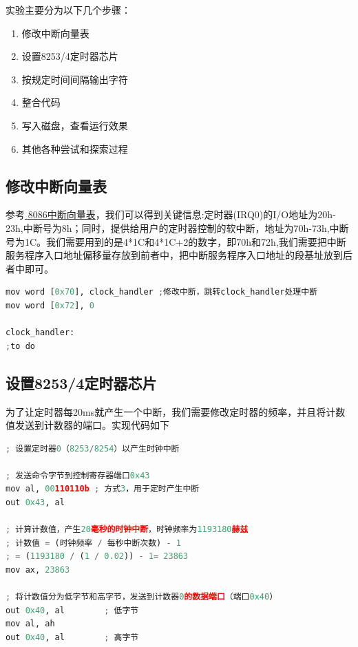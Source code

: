 \documentclass{LabReport}
\begin{document}
	实验主要分为以下几个步骤：
	
	\begin{enumerate}
		\item 修改中断向量表
		\item 设置8253/4定时器芯片
		\item 按规定时间间隔输出字符
		\item 整合代码
		\item 写入磁盘，查看运行效果
		\item 其他各种尝试和探索过程
	\end{enumerate}
	
	\subsection{修改中断向量表}
	参考\href{https://blog.csdn.net/nicholas199109/article/details/8557484?ops_request_misc=%257B%2522request%255Fid%2522%253A%2522171153468616800180615319%2522%252C%2522scm%2522%253A%252220140713.130102334.pc%255Fall.%2522%257D&request_id=171153468616800180615319&biz_id=0&utm_medium=distribute.pc_search_result.none-task-blog-2~all~first_rank_ecpm_v1~rank_v31_ecpm-2-8557484-null-null.142^v100^pc_search_result_base5&utm_term=8086%E6%97%B6%E9%92%9F%E4%B8%AD%E6%96%AD%E5%90%91%E9%87%8F%E8%A1%A8&spm=1018.2226.3001.4187}{\color{red} {8086中断向量表}}，我们可以得到关键信息:定时器(IRQ0)的I/O地址为20h-23h,中断号为8h；同时，提供给用户的定时器控制的软中断，地址为70h-73h,中断号为1C。我们需要用到的是4*1C和4*1C+2的数字，即70h和72h,我们需要把中断服务程序入口地址偏移量存放到前者中，把中断服务程序入口地址的段基址放到后者中即可。
	\begin{lstlisting}[language=python,frame=shadowbox]
mov word [0x70], clock_handler ;修改中断，跳转clock_handler处理中断
mov word [0x72], 0

clock_handler:
;to do
	\end{lstlisting}
	
	
	\subsection{设置8253/4定时器芯片}
	为了让定时器每20ms就产生一个中断，我们需要修改定时器的频率，并且将计数值发送到计数器的端口。实现代码如下
	\begin{lstlisting}[language=python,frame=shadowbox]
; 设置定时器0（8253/8254）以产生时钟中断

; 发送命令字节到控制寄存器端口0x43
mov al, 00110110b ; 方式3，用于定时产生中断
out 0x43, al

; 计算计数值，产生20毫秒的时钟中断，时钟频率为1193180赫兹
; 计数值 = (时钟频率 / 每秒中断次数) - 1
; = (1193180 / (1 / 0.02)) - 1= 23863
mov ax, 23863

; 将计数值分为低字节和高字节，发送到计数器0的数据端口（端口0x40）
out 0x40, al        ; 低字节
mov al, ah
out 0x40, al        ; 高字节
	\end{lstlisting}
	
\end{document}
